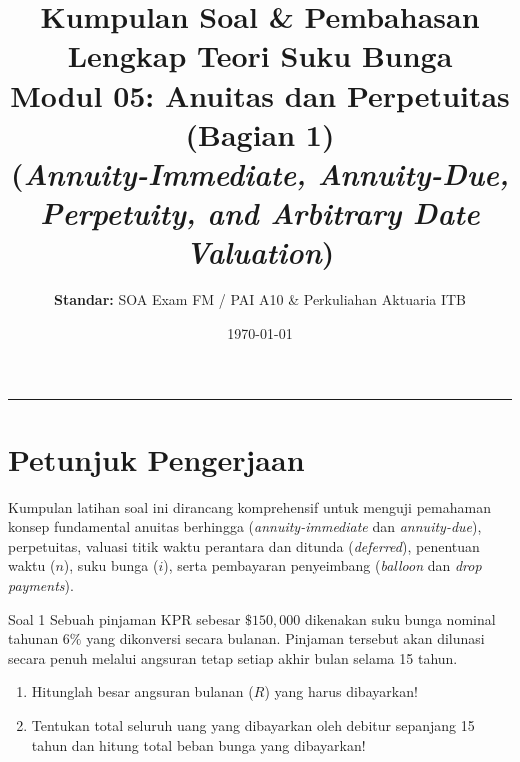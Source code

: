 \documentclass[11pt,a4paper]{article}
\title{\textbf{\LARGE Kumpulan Soal \& Pembahasan Lengkap Teori Suku Bunga}\\[0.3em]
\Large Modul 05: Anuitas dan Perpetuitas (Bagian 1)\\
\large (\textit{Annuity-Immediate, Annuity-Due, Perpetuity, and Arbitrary Date Valuation})}
\author{\textbf{Standar:} SOA Exam FM / PAI A10 \& Perkuliahan Aktuaria ITB}
\date{\today}
\begin{document}
\maketitle
\noindent\rule{\textwidth}{0.4pt}
\vspace{1em}

\section*{Petunjuk Pengerjaan}
Kumpulan latihan soal ini dirancang komprehensif untuk menguji pemahaman konsep fundamental anuitas berhingga (\textit{annuity-immediate} dan \textit{annuity-due}), perpetuitas, valuasi titik waktu perantara dan ditunda (\textit{deferred}), penentuan waktu ($n$), suku bunga ($i$), serta pembayaran penyeimbang (\textit{balloon} dan \textit{drop payments}).

\vspace{1em}

\begin{problembox}{Soal 1}
Sebuah pinjaman KPR sebesar $\$150{,}000$ dikenakan suku bunga nominal tahunan $6\%$ yang dikonversi secara bulanan. Pinjaman tersebut akan dilunasi secara penuh melalui angsuran tetap setiap akhir bulan selama 15 tahun.
\begin{enumerate}[label=(\alph*)]
    \item Hitunglah besar angsuran bulanan ($R$) yang harus dibayarkan!
    \item Tentukan total seluruh uang yang dibayarkan oleh debitur sepanjang 15 tahun dan hitung total beban bunga yang dibayarkan!
\end{enumerate}
\end{problembox}
\end{document}
